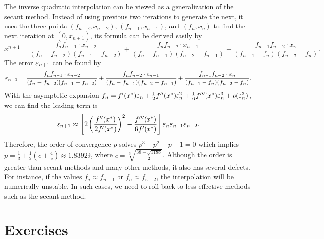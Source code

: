 The inverse quadratic interpolation can be viewed as a generalization of the secant method. Instead of using previous two iterations to generate the next, it uses the three points $(f_{n-2}, x_{n-2})$, $(f_{n-1}, x_{n-1})$, and $(f_{n}, x_{n})$ to find the next iteration at $(0, x_{n+1})$, its formula can be derived easily by 
\begin{equation*}
    x^{n+1} = \frac{f_n f_{n-1}\cdot x_{n-2}}{(f_n - f_{n-2})(f_{n-1} - f_{n-2})}  +  \frac{f_n f_{n-2}\cdot x_{n-1} }{(f_{n} - f_{n-1})(f_{n-2} - f_{n-1})} +  \frac{f_{n-1} f_{n-2}\cdot  x_{n}}{(f_{n-1} - f_{n})(f_{n-2} - f_{n})}.
\end{equation*}
The error $\varepsilon_{n+1}$ can be found by 
\begin{equation*}
    \varepsilon_{n+1} = \frac{f_n f_{n-1} \cdot \varepsilon_{n-2} }{(f_n - f_{n-2})(f_{n-1} - f_{n-2})}  +  \frac{f_n f_{n-2}\cdot \varepsilon_{n-1}  }{(f_{n} - f_{n-1})(f_{n-2} - f_{n-1})} +  \frac{f_{n-1} f_{n-2}\cdot  \varepsilon_{n}}{(f_{n-1} - f_{n})(f_{n-2} - f_{n})}.
\end{equation*}
With the asymptotic expansion $f_n = f'(x^{\ast}) \varepsilon_n + \frac{1}{2} f''(x^{\ast}) \varepsilon_n^2 + \frac{1}{6} f'''(x^{\ast})\varepsilon_n^3 + o(\varepsilon_n^3)$, we can find the leading term is 
$$\varepsilon_{n+1} \approx \left[2 \left(\frac{f''(x^{\ast})}{2f'(x^{\ast})} \right)^2 - \frac{f'''(x^{\ast})}{6f'(x^{\ast})} \right]\varepsilon_{n}\varepsilon_{n-1}\varepsilon_{n-2}.$$
Therefore, the order of convergence $p$ solves $p^3 - p^2 - p - 1 = 0$ which implies $p = \frac{1}{3} + \frac{1}{3}\left(c + \frac{4}{c}\right)\approx 1.83929$, where $c = \sqrt[3]{\frac{38 - \sqrt{1188}}{2}}$. Although the order is greater than secant methods and many other methods, it also has several defects. For instance, if the values $f_n\approx f_{n-1}$ or $f_n\approx f_{n-2}$, the interpolation will be numerically unstable. In such cases, we need to roll back to less effective methods such as the secant method.  

\section{Exercises}
